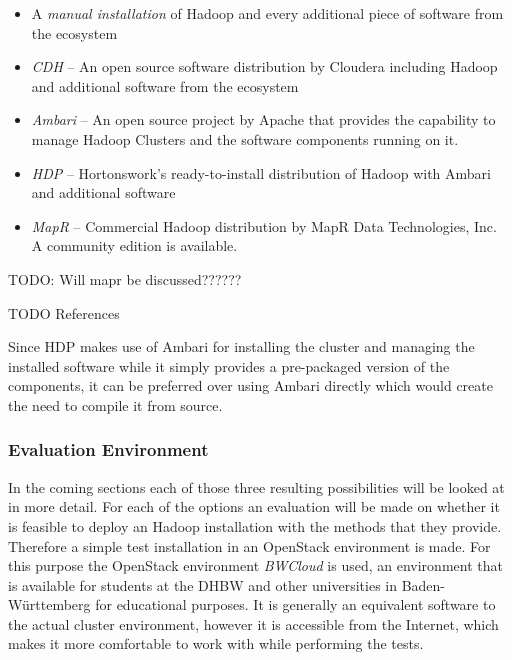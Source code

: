 \begin{itemize}
    \item A \emph{manual installation} of Hadoop 
        and every additional piece of software from the ecosystem
    \item \emph{\acf{CDH}} --  An open source software distribution by Cloudera including Hadoop
        and additional software from the ecosystem
    \item \emph{Ambari} -- An open source project by Apache that provides
        the capability to manage Hadoop Clusters and the software components running on it.
    \item \emph{\acf{HDP}} -- Hortonswork's ready-to-install distribution of Hadoop 
        with Ambari and additional software
    \item \emph{MapR} -- Commercial Hadoop distribution by MapR Data Technologies, Inc. A community edition is available. 
        
\end{itemize}

TODO: Will mapr be discussed??????

TODO References

Since \ac{HDP} makes use of Ambari for installing the cluster and managing the installed software while it simply provides a pre-packaged version of the components, 
it can be preferred over using Ambari directly which would create the need to compile it from source.


\subsubsection{Evaluation Environment}
In the coming sections each of those three resulting possibilities will be looked at in more detail.
For each of the options an evaluation will be made on whether it is 
feasible to deploy an Hadoop installation with the methods that they provide.
Therefore a simple test installation in an OpenStack environment is made.
For this purpose the OpenStack environment \emph{BWCloud} 
is used, an environment that is available for students at the \ac{DHBW} 
and other universities in Baden-Württemberg for educational purposes. 
It is generally an equivalent software to the actual cluster environment, 
however it is accessible from the Internet, 
which makes it more comfortable to work with while performing the tests.

